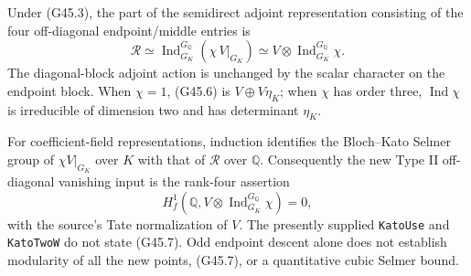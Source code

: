 \begin{proposition}
\label{AC-G45-cohomology}
Under (G45.3), the part of the semidirect adjoint representation
consisting of the four off-diagonal endpoint/middle entries is
\[
 \mathcal R\simeq
 \operatorname{Ind}_{G_K}^{G_{\mathbb Q}}(\chi\,V|_{G_K})
 \simeq V\otimes\operatorname{Ind}_{G_K}^{G_{\mathbb Q}}\chi.
                                                               \tag{G45.6}
\]
The diagonal-block adjoint action is unchanged by the scalar
character on the endpoint block.  When $\chi=1$, (G45.6) is
$V\oplus V\eta_K$; when $\chi$ has order three,
$\operatorname{Ind}\chi$ is irreducible of dimension two and
has determinant $\eta_K$.

For coefficient-field representations, induction identifies the
Bloch--Kato Selmer group of $\chi V|_{G_K}$ over $K$ with that
of $\mathcal R$ over $\mathbb Q$.  Consequently the new Type II
off-diagonal vanishing input is the rank-four assertion
\[
 H^1_f\!\left(\mathbb Q,
        V\otimes\operatorname{Ind}_{G_K}^{G_{\mathbb Q}}\chi
        \right)=0,                                      \tag{G45.7}
\]
with the source's Tate normalization of $V$.
The presently supplied \texttt{KatoUse} and \texttt{KatoTwoW}
do not state (G45.7).  Odd endpoint descent alone does not
establish modularity of all the new points, (G45.7), or a
quantitative cubic Selmer bound.
\end{proposition}
